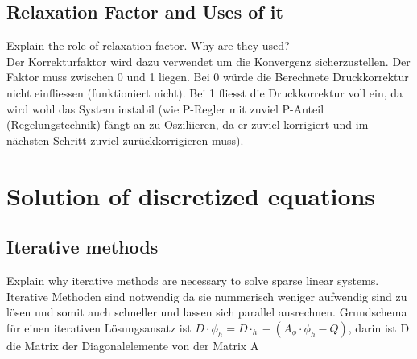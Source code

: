\documentclass[a4paper]{scrartcl}
\begin{document}
\subsection{Relaxation Factor and Uses of it}
Explain the role of relaxation factor. Why are they used?\\

Der Korrekturfaktor wird dazu verwendet um die Konvergenz sicherzustellen. Der
Faktor muss zwischen 0 und 1 liegen. Bei 0 würde die Berechnete Druckkorrektur
nicht einfliessen (funktioniert nicht). Bei 1 fliesst die Druckkorrektur voll
ein, da wird wohl das System instabil (wie P-Regler mit zuviel P-Anteil
(Regelungstechnik) fängt an zu Osziliieren, da er zuviel korrigiert und im
nächsten Schritt zuviel zurückkorrigieren muss).

\section{Solution of discretized equations}

\subsection{Iterative methods} 
Explain why iterative methods are necessary to solve sparse linear systems.\\

Iterative Methoden sind notwendig da sie nummerisch weniger aufwendig sind zu lösen und somit auch schneller und lassen sich parallel ausrechnen. Grundschema für einen iterativen Lösungsansatz ist $ D \cdot \phi_h = D \cdot_h - (A_\phi \cdot \phi_h - Q)$, darin ist D die Matrix der Diagonalelemente von der Matrix A
\end{document}
